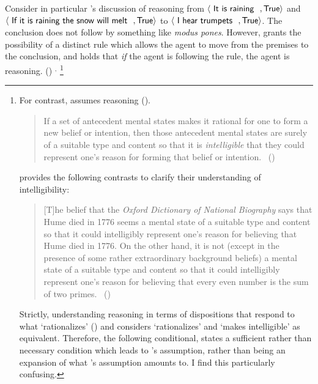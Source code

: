 \begin{note}
{    Consider in particular \citeauthor{Broome:2013aa}'s discussion of reasoning from \(\pv{\prop{It is raining}}{\val{True}}\) and \(\pv{\prop{If it is raining the snow will melt}}{\val{True}}\) to \(\pv{\prop{I hear trumpets}}{\val{True}}\).
    The conclusion does not follow by something like \emph{modus pones}.
    However, \citeauthor{Broome:2013aa} grants the possibility of a distinct rule which allows the agent to move from the premises to the conclusion, and holds that \emph{if} the agent is following the rule, the agent is reasoning.
    (\citeyear[233]{Broome:2013aa})
  }%
  \(^{,}\)%
  \footnote{
    For contrast, \citeauthor{Wedgwood:2006ui} assumes reasoning  (\citeyear[600]{Wedgwood:2006ui}).

   \begin{quote}
    If a set of antecedent mental states makes it rational for one to form a new belief or intention, then those antecedent mental states are surely of a suitable type and content so that it is \emph{intelligible} that they could represent one's reason for forming that belief or intention.%
    \mbox{ }\hfill\mbox{(\citeyear[662]{Wedgwood:2006ui})}
  \end{quote}

   \citeauthor{Wedgwood:2006ui} provides the following contrasts to clarify their understanding of intelligibility:

  \begin{quote}
    [T]he belief that the \emph{Oxford Dictionary of National Biography} says that Hume died in 1776 seems a mental state of a suitable type and content so that it could intelligibly represent one's reason for believing that Hume died in 1776.
    On the other hand, it is not (except in the presence of some rather extraordinary background beliefs) a mental state of a suitable type and content so that it could intelligibly represent one's reason for believing that every even number is the sum of two primes.%
    \mbox{ }\hfill\mbox{(\citeyear[662]{Wedgwood:2006ui})}
  \end{quote}

  Strictly, \citeauthor{Wedgwood:2006ui} understanding reasoning in terms of dispositions that respond to what `rationalizes' (\citeyear[672]{Wedgwood:2006ui}) and \citeauthor{Wedgwood:2006ui} considers `rationalizes' and  `makes intelligible' as equivalent.
    Therefore, the following conditional, states a sufficient rather than necessary condition which leads to \citeauthor{Wedgwood:2006ui}'s assumption, rather than being an expansion of what \citeauthor{Wedgwood:2006ui}'s assumption amounts to.
    I find this particularly confusing.
  }


\end{note}

